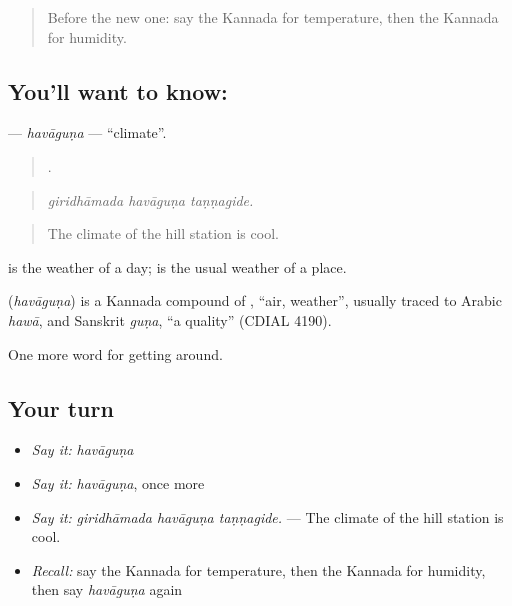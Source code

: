 \label{lesson:KA-C484-havaguna}



\begin{quote}
Before the new one: say the Kannada for temperature, then the Kannada for humidity.
\end{quote}

\subsection*{You'll want to know: }
\textbf{} — \emph{havāguṇa} — \textquotedblleft{}climate\textquotedblright{}.

\begin{quote}
  .
\end{quote}

\begin{quote}
\emph{giridhāmada havāguṇa taṇṇagide.}
\end{quote}

\begin{quote}
The climate of the hill station is cool.
\end{quote}

 is the weather of a day;  is the usual weather of a place.

\begin{cousinweb}
\textbf{} (\emph{havāguṇa}) is a Kannada compound of , \textquotedblleft{}air, weather\textquotedblright{}, usually traced to Arabic \emph{hawā}, and Sanskrit \emph{guṇa}, \textquotedblleft{}a quality\textquotedblright{} (CDIAL 4190).
\end{cousinweb}

\begin{grammarlens}[title={What you've built}]
One more word for getting around.
\end{grammarlens}

\subsection*{Your turn}
\begin{itemize}
\raggedright
  \item \emph{Say it:} \emph{havāguṇa}
  \item \emph{Say it:} \emph{havāguṇa}, once more
  \item \emph{Say it:} \emph{giridhāmada havāguṇa taṇṇagide.} — The climate of the hill station is cool.
  \item \emph{Recall:} say the Kannada for temperature, then the Kannada for humidity, then say \emph{havāguṇa} again
\end{itemize}

